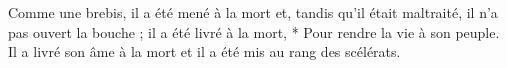 Comme une brebis, il a été mené à la mort et, tandis qu'il était maltraité, il n'a pas ouvert la bouche ; il a été livré à la mort,
* Pour rendre la vie à son peuple.
\versseparator
Il a livré son âme à la mort et il a été mis au rang des scélérats.